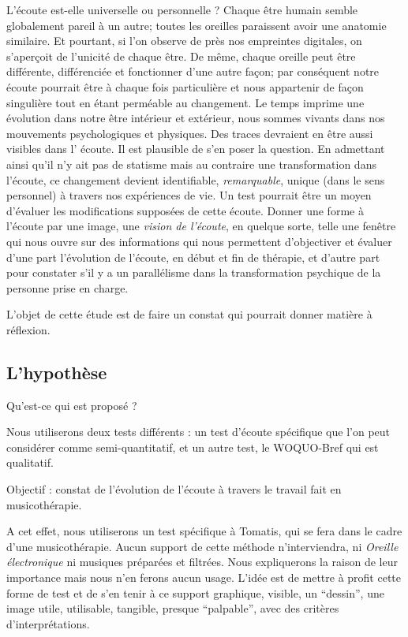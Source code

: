 L'écoute est-elle universelle ou personnelle ?
 Chaque être humain semble  globalement pareil à un autre; toutes les oreilles 
paraissent  avoir une anatomie similaire. Et pourtant, si l'on observe de près 
nos empreintes digitales, on s'aperçoit de l'unicité de chaque être. De même, 
chaque oreille peut être différente, différenciée et  fonctionner d'une autre 
façon;  par conséquent notre  écoute pourrait être à chaque fois particulière 
et nous appartenir de façon singulière tout en étant perméable au changement.
Le temps imprime une évolution dans notre être intérieur et extérieur, nous 
sommes vivants dans nos mouvements psychologiques et physiques. Des traces 
devraient en être aussi visibles dans l' écoute. Il est plausible de s'en poser 
la question.
En admettant ainsi qu'il n'y ait pas de statisme mais au contraire une 
transformation dans l'écoute, ce changement devient identifiable, 
\textit{remarquable}, unique (dans le sens personnel) à travers nos expériences 
de vie.  Un test pourrait être un moyen d'évaluer les modifications supposées 
de cette écoute. 
Donner une forme à l'écoute par une image, une \emph{vision de l'écoute}, en 
quelque sorte, telle une fenêtre qui nous ouvre sur des informations qui nous 
permettent d'objectiver et évaluer d'une part 
 l'évolution de l'écoute, en début et fin de thérapie, et d'autre part pour 
constater s'il y a un parallélisme dans la transformation psychique  de la 
personne prise en charge.

L'objet de cette étude est de faire un constat
qui pourrait donner matière à réflexion.


\subsection{L'hypothèse}

Qu'est-ce qui est proposé ? 
	
	Nous utiliserons deux tests différents : 
	un test d'écoute spécifique que l'on peut considérer comme 
semi-quantitatif, 
	et un autre test, le WOQUO-Bref qui est qualitatif.
	
Objectif : constat de l'évolution de l'écoute à travers le travail fait en 
musicothérapie.

A cet effet, nous utiliserons un test spécifique à Tomatis, qui se fera dans le 
cadre d'une musicothérapie. Aucun support de cette méthode n'interviendra, ni 
\textsl{Oreille
	électronique} ni musiques préparées et filtrées. Nous expliquerons la 
raison de   leur importance mais nous n'en ferons aucun usage. L'idée est de 
mettre à profit cette forme de test et de  s'en tenir à ce support
graphique, visible, un ``dessin'', une image utile, utilisable, tangible,
presque ``palpable'', avec des critères
d'interprétations.
	



